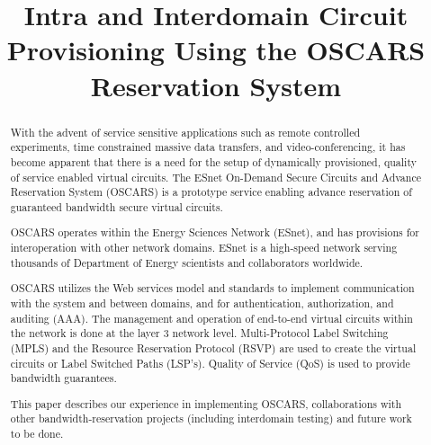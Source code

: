 \documentclass[conference]{IEEEtran}
\begin{document}
\title{Intra and Interdomain Circuit Provisioning Using the OSCARS Reservation System}

% 
\author{
}

\maketitle

\begin{abstract}
With the advent of service sensitive applications such as remote controlled 
experiments, time constrained massive data transfers, and video-conferencing,
it has become apparent that there is a need for the setup of dynamically 
provisioned, quality of service enabled virtual circuits.
The ESnet On-Demand Secure Circuits and Advance Reservation System (OSCARS) is 
a prototype service enabling advance reservation of guaranteed bandwidth 
secure virtual circuits.

OSCARS operates within the Energy Sciences Network (ESnet), and has
provisions for interoperation with other network domains.
ESnet is a high-speed network serving thousands 
of Department of Energy scientists and collaborators worldwide.

OSCARS utilizes the Web services model and standards to implement communication
with the system and between domains, and for authentication, authorization,
and auditing (AAA).  The management and operation of end-to-end virtual 
circuits within the network is done at the layer 3 network level.  
Multi-Protocol Label Switching (MPLS) and the Resource Reservation Protocol 
(RSVP)
are used to create the virtual circuits or Label Switched Paths (LSP's). 
Quality of Service (QoS) is used to provide bandwidth guarantees.

This paper describes our experience in implementing OSCARS, collaborations
with other bandwidth-reservation projects (including interdomain testing) and 
future work to be done.

\end{abstract}
\end{document}
